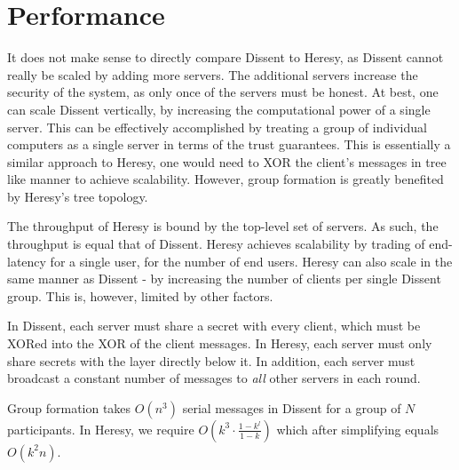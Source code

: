 \section{Performance}

It does not make sense to directly compare Dissent to Heresy, as Dissent cannot really be scaled by adding more servers. The additional servers increase the security of the system, as only once of the servers must be honest. At best, one can scale Dissent vertically, by increasing the computational power of a single server. This can be effectively accomplished by treating a group of individual computers as a single server in terms of the trust guarantees. This is essentially a similar approach to Heresy, one would need to XOR the client's messages in tree like manner to achieve scalability. However, group formation is greatly benefited  by Heresy's tree topology.

The throughput of Heresy is bound by the top-level set of servers. As such,
the throughput is equal that of Dissent. Heresy achieves scalability by trading of end-latency for a single user, for the number of end users. Heresy can also scale in the same manner as Dissent - by increasing the number of clients per single Dissent group. This is, however, limited by other factors.

In Dissent, each server must share a secret with every client, which must be XORed into the XOR of the client messages. In Heresy, each server must only share secrets with the layer directly below it. In addition, each server must broadcast a constant number of messages to \emph{all} other servers in each round. 
 
Group formation takes $O(n^3)$ serial messages in Dissent for a group of $N$ participants. In Heresy, we require $O(k^3 \cdot \frac{1-k^l}{1-k})$ which after simplifying equals $O(k^2n)$. 




